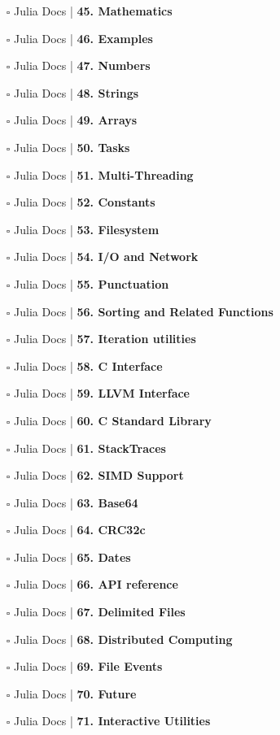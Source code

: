 \documentclass[a4, landscape, 12pt]{article}
\newcommand{\checkbox}{$\square$}%
\begin{document}
\begin{itemize}
{}
\item [\checkbox]  Julia Docs | \textbf{ 45. Mathematics
}
\item [\checkbox]  Julia Docs | \textbf{ 46. Examples
}
\item [\checkbox]  Julia Docs | \textbf{ 47. Numbers
}
\item [\checkbox]  Julia Docs | \textbf{ 48. Strings
}
\item [\checkbox]  Julia Docs | \textbf{ 49. Arrays
}
\item [\checkbox]  Julia Docs | \textbf{ 50. Tasks
}
\item [\checkbox]  Julia Docs | \textbf{ 51. Multi-Threading
}
\item [\checkbox]  Julia Docs | \textbf{ 52. Constants
}
\item [\checkbox]  Julia Docs | \textbf{ 53. Filesystem
}
\item [\checkbox]  Julia Docs | \textbf{ 54. I/O and Network
}
\item [\checkbox]  Julia Docs | \textbf{ 55. Punctuation
}
\item [\checkbox]  Julia Docs | \textbf{ 56. Sorting and Related Functions
}
\item [\checkbox]  Julia Docs | \textbf{ 57. Iteration utilities
}
\item [\checkbox]  Julia Docs | \textbf{ 58. C Interface
}
\item [\checkbox]  Julia Docs | \textbf{ 59. LLVM Interface
}
\item [\checkbox]  Julia Docs | \textbf{ 60. C Standard Library
}
\item [\checkbox]  Julia Docs | \textbf{ 61. StackTraces
}
\item [\checkbox]  Julia Docs | \textbf{ 62. SIMD Support
}
\item [\checkbox]  Julia Docs | \textbf{ 63. Base64
}
\item [\checkbox]  Julia Docs | \textbf{ 64. CRC32c
}
\item [\checkbox]  Julia Docs | \textbf{ 65. Dates
}
\item [\checkbox]  Julia Docs | \textbf{ 66. API reference
}
\item [\checkbox]  Julia Docs | \textbf{ 67. Delimited Files
}
\item [\checkbox]  Julia Docs | \textbf{ 68. Distributed Computing
}
\item [\checkbox]  Julia Docs | \textbf{ 69. File Events
}
\item [\checkbox]  Julia Docs | \textbf{ 70. Future
}
\item [\checkbox]  Julia Docs | \textbf{ 71. Interactive Utilities
}
\end{itemize}
\end{document}
